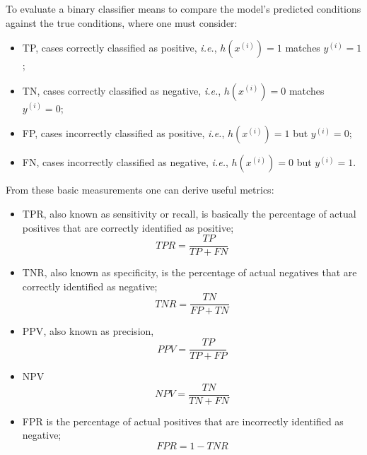 To evaluate a binary classifier means to compare the model's predicted conditions against the true conditions, where one must consider:

\begin{itemize}
    \item \ac{TP}, cases correctly classified as positive, \textit{i.e.}, $h(x^{(i)}) = 1$ matches $y^{(i)} = 1$;
    \item \ac{TN}, cases correctly classified as negative, \textit{i.e.}, $h(x^{(i)}) = 0$ matches $y^{(i)} = 0$;
    \item \ac{FP}, cases incorrectly classified as positive, \textit{i.e.}, $h(x^{(i)}) = 1$ but $y^{(i)} = 0$;
    \item \ac{FN}, cases incorrectly classified as negative, \textit{i.e.}, $h(x^{(i)}) = 0$ but $y^{(i)} = 1$.
\end{itemize}

From these basic measurements one can derive useful metrics:

\begin{itemize}
    \item \ac{TPR}, also known as sensitivity or recall, is basically the percentage of actual positives that are correctly identified as positive;
        \begin{equation}
        TPR = \frac{TP}{TP + FN}
        \end{equation}
    \item \ac{TNR}, also known as specificity, is the percentage of actual negatives that are correctly identified as negative;
        \begin{equation}
        TNR = \frac{TN}{FP + TN}
        \end{equation}
    \item \ac{PPV}, also known as precision,
        \begin{equation}
        PPV = \frac{TP}{TP + FP}
        \end{equation}
    \item \ac{NPV}
        \begin{equation}
        NPV = \frac{TN}{TN + FN}
        \end{equation}
    \item \ac{FPR} is the percentage of actual positives that are incorrectly identified as negative;
        \begin{equation}
        FPR = 1 - TNR
        \end{equation}
\end{itemize}

